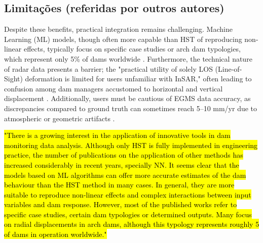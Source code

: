 \documentclass[11pt,a4paper]{article}
\begin{document}

\subsection{Limitações (referidas por outros autores)}

Despite these benefits, practical integration remains challenging. Machine Learning (ML) models, though often more capable than HST of reproducing non-linear effects, typically focus on specific case studies or arch dam typologies, which represent only 5\% of dams worldwide \parencite{salazarAnomalyDetectionDam2021}. Furthermore, the technical nature of radar data presents a barrier; the "practical utility of solely LOS (Line-of-Sight) deformation is limited for users unfamiliar with InSAR," often leading to confusion among dam managers accustomed to horizontal and vertical displacement \parencite{ruiz-armenteros2023}. Additionally, users must be cautious of EGMS data accuracy, as discrepancies compared to ground truth can sometimes reach 5–10 mm/yr due to atmospheric or geometric artifacts \parencite{crosetto2025}.

\hl{\mbox{\parencite{salazarAnomalyDetectionDam2021}} "There is a growing interest in the application of innovative tools in dam monitoring data  analysis. Although only HST is fully implemented in engineering practice, the number of  publications on the application of other methods has increased considerably in recent years,  specially NN.  It seems clear that the models based on ML algorithms can offer more accurate estimates  of the dam behaviour than the HST method in many cases. In general, they are more suitable  to reproduce non-linear effects and complex interactions between input variables and dam  response.  However, most of the published works refer to specific case studies, certain dam typologies  or determined outputs. Many focus on radial displacements in arch dams, although this  typology represents roughly 5 of dams in operation worldwide."}
\end{document}
